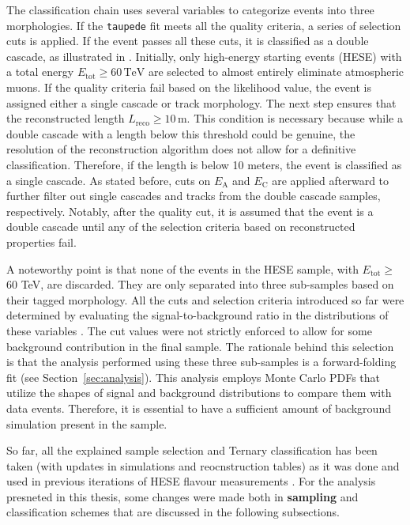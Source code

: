 The classification chain uses several variables to categorize events into three morphologies. If the \texttt{taupede} fit meets all the quality criteria, a series of selection cuts is applied. If the event passes all these cuts, it is classified as a double cascade, as illustrated in . Initially, only high-energy starting events (HESE) with a total energy \(E_{\mathrm{tot}} \geq 60 \, \text{TeV}\) are selected to almost entirely eliminate atmospheric muons. If the quality criteria fail based on the likelihood value, the event is assigned either a single cascade or track morphology. The next step ensures that the reconstructed length \(L_{\mathrm{reco}} \geq 10 \, \text{m}\). This condition is necessary because while a double cascade with a length below this threshold could be genuine, the resolution of the reconstruction algorithm does not allow for a definitive classification. Therefore, if the length is below 10 meters, the event is classified as a single cascade. As stated before, cuts on \(E_{\text{A}}\) and \(E_{\text{C}}\) are applied afterward to further filter out single cascades and tracks from the double cascade samples, respectively. Notably, after the quality cut, it is assumed that the event is a double cascade until any of the selection criteria based on reconstructed properties fail.

A noteworthy point is that none of the events in the HESE sample, with $E_{\mathrm{tot}} \geq$ 60 TeV, are discarded. They are only separated into three sub-samples based on their tagged morphology. All the cuts and selection criteria introduced so far were determined by evaluating the signal-to-background ratio in the distributions of these variables . The cut values were not strictly enforced to allow for some background contribution in the final sample. The rationale behind this selection is that the analysis performed using these three sub-samples is a forward-folding fit (see Section~\ref{sec:analysis}). This analysis employs Monte Carlo PDFs that utilize the shapes of signal and background distributions to compare them with data events. Therefore, it is essential to have a sufficient amount of background simulation present in the sample.

So far, all the explained sample selection and Ternary classification has been taken (with updates in simulations and reocnstruction tables) as it was done and used in previous iterations of HESE flavour measurements . For the analysis presneted in this thesis, some changes were made both in \textbf{sampling} and classification schemes that are discussed in the following subsections. 

